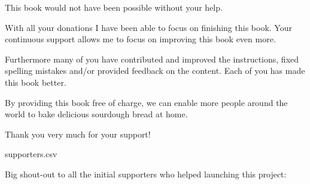 This book would not have been possible without your help.

With all your donations I have been able to focus on finishing
this book. Your continuous support allows me to focus
on improving this book even more.

Furthermore many of you have contributed and improved the
instructions, fixed spelling mistakes and/or provided
feedback on the content. Each of you has made this book
better.

By providing this book free of charge,
we can enable more people around the world to bake delicious sourdough
bread at home.

Thank you very much for your support!\\

\begin{filecontents}{supporters.csv}
  \end{filecontents}

  {Big shout-out to all the initial supporters who helped launching this project:}


